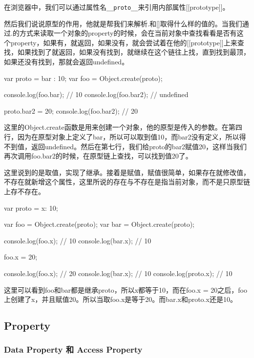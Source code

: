 在浏览器中，我们可以通过属性名\lstinline!__proto__!来引用内部属性[[prototype]]。
	
然后我们说说原型的作用，他就是帮我们来解析.和[]取得什么样的值的。当我们通过.的方式来读取一个对象的property的时候，会在当前对象中查找看看是否有这个property，如果有，就返回，如果没有，就会尝试着在他的[[prototype]]上来查找，如果找到了就返回，如果没有找到，就继续在这个链往上找，直到找到最顶，如果还没有找到，那就会返回undefined。
	
	
\begin{JavaScript}
var proto = {bar : 10};
var foo = Object.create(proto);

console.log(foo.bar); // 10
console.log(foo.bar2); // undefined

proto.bar2 = 20; 
console.log(foo.bar2); // 20
\end{JavaScript}
	
这里的Object.create函数是用来创建一个对象，他的原型是传入的参数。在第四行，因为在原型对象上定义了bar，所以可以取到值10，而bar2没有定义，所以得不到值，返回undefined。然后在第七行，我们给proto的bar2赋值20，这样当我们再次调用foo.bar2的时候，在原型链上查找，可以找到值20了。
	
	
这里说到的是取值，实现了继承。接着是赋值，赋值很简单，如果存在就修改值，不存在就新增这个属性，这里所说的存在与不存在是指当前对象，而不是只原型链上存不存在。
	
\begin{JavaScript}
var proto = {x: 10};

var foo = Object.create(proto);
var bar = Object.create(proto);

console.log(foo.x); // 10
console.log(bar.x); // 10

foo.x = 20;

console.log(foo.x); // 20
console.log(bar.x); // 10
console.log(proto.x); // 10
\end{JavaScript}
		
这里可以看到foo和bar都是继承proto，所以x都等于10，而在foo.x = 20之后，foo上创建了x，并且赋值20。所以当取foo.x是等于20。而bar.x和proto.x还是10。

\subsection{Property}

\subsubsection{Data Property 和 Access Property}

